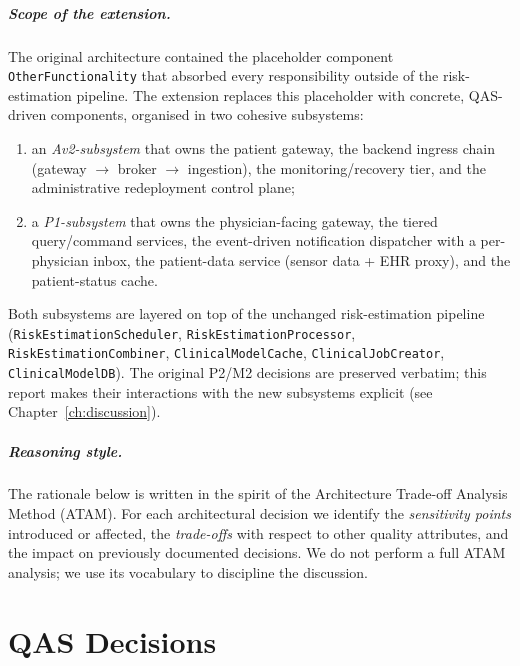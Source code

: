 \paragraph{Scope of the extension.}
The original architecture contained the placeholder component
\texttt{OtherFunctionality} that absorbed every responsibility outside of
the risk-estimation pipeline. The extension replaces this placeholder with
concrete, QAS-driven components, organised in two cohesive subsystems:
\begin{enumerate}
  \item an \emph{Av2-subsystem} that owns the patient gateway, the backend
        ingress chain (gateway $\rightarrow$ broker $\rightarrow$
        ingestion), the monitoring/recovery tier, and the administrative
        redeployment control plane;
  \item a \emph{P1-subsystem} that owns the physician-facing gateway, the
        tiered query/command services, the event-driven notification
        dispatcher with a per-physician inbox, the patient-data service
        (sensor data + EHR proxy),
        and the patient-status cache.
\end{enumerate}
Both subsystems are layered on top of the unchanged risk-estimation
pipeline (\texttt{RiskEstimationScheduler}, \texttt{RiskEstimationProcessor},
\texttt{RiskEstimationCombiner}, \texttt{ClinicalModelCache},
\texttt{ClinicalJobCreator}, \texttt{ClinicalModelDB}). The original P2/M2
decisions are preserved verbatim; this report makes their interactions with
the new subsystems explicit (see Chapter~\ref{ch:discussion}).

\paragraph{Reasoning style.}
The rationale below is written in the spirit of the Architecture Trade-off
Analysis Method (ATAM). For each architectural decision we identify the
\emph{sensitivity points} introduced or affected, the \emph{trade-offs}
with respect to other quality attributes, and the impact on previously
documented decisions. We do not perform a full ATAM analysis; we use its
vocabulary to discipline the discussion.


\chapter{QAS Decisions}
\label{ch:qas-decisions}

